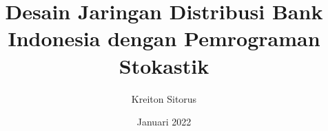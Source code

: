 \documentclass[a4paper,12pt]{book}
\begin{document}
\author{Kreiton Sitorus}
\title{Desain Jaringan Distribusi Bank Indonesia dengan Pemrograman Stokastik}
\date{Januari 2022}

\frontmatter
\maketitle
\tableofcontents

\mainmatter



\backmatter
\end{document}
